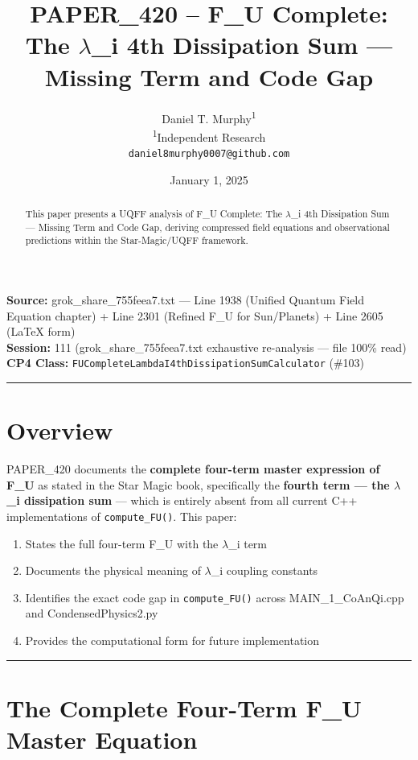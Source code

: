 \documentclass[12pt,a4paper]{article}
\title{\textbf{PAPER\_420 -- F\_U Complete: \\ The $\lambda$\_i 4th Dissipation Sum --- Missing Term and Code Gap}}
\author{
Daniel T. Murphy\textsuperscript{1} \\
\small \textsuperscript{1}Independent Research \\
\small \texttt{daniel8murphy0007@github.com}
}
\date{January 1, 2025}
\begin{document}
\maketitle

\begin{flushleft}
\textbf{Source:} grok\_{share\_755feea7}.txt --- Line 1938 (Unified Quantum Field Equation chapter) + Line 2301 (Refined F\_U for Sun/Planets) + Line 2605 (LaTeX form) \\
\textbf{Session:} 111 (grok\_{share\_755feea7}.txt exhaustive re-analysis --- file 100\% read) \\
\textbf{CP4 Class:} \texttt{FUCompleteLambdaI4thDissipationSumCalculator} (\#103) \\
\end{flushleft}

\medskip\hrule\medskip

\begin{abstract}
This paper presents a UQFF analysis of F\_U Complete: The $\lambda$\_i 4th Dissipation Sum --- Missing Term and Code Gap, deriving compressed field equations and observational predictions within the Star-Magic/UQFF framework.
\end{abstract}

\section{Overview}

PAPER\_420 documents the \textbf{complete four-term master expression of F\_U} as stated in the Star Magic book, specifically the \textbf{fourth term --- the $\lambda$\_i dissipation sum} --- which is entirely absent from all current C++ implementations of \texttt{compute\_FU()}. This paper:

\begin{enumerate}
  \item States the full four-term F\_U with the $\lambda$\_i term
  \item Documents the physical meaning of $\lambda$\_i coupling constants
  \item Identifies the exact code gap in \texttt{compute\_FU()} across MAIN\_{1\_CoAnQi}.cpp and CondensedPhysics2.py
  \item Provides the computational form for future implementation
\end{enumerate}

\medskip\hrule\medskip

\section{The Complete Four-Term F\_U Master Equation}
\end{document}
